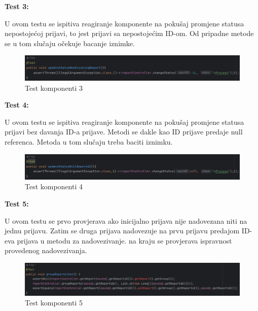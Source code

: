 			\textbf{Test 3:}
			
			U ovom testu se ispitiva reagiranje komponente na pokušaj promjene statusa nepostojećoj prijavi, to jest prijavi sa nepostojećim ID-om. Od pripadne metode se u tom slučaju očekuje bacanje iznimke.
			
			\begin{figure}[H]
				\includegraphics[width=\textwidth]{slike/JUnitTest3.png} %
				\caption{Test komponenti 3}
				\label{fig:JUnitTest3} %
			\end{figure}
				
			\textbf{Test 4:}
			
			U ovom testu se ispitiva reagiranje komponente na pokušaj promjene statusa prijavi bez davanja ID-a prijave. Metodi se dakle kao ID prijave predaje null referenca. Metoda u tom slučaju treba baciti iznimku.
			
			\begin{figure}[H]
				\includegraphics[width=\textwidth]{slike/JUnitTest4.png} %
				\caption{Test komponenti 4}
				\label{fig:JUnitTest4} %
			\end{figure}
			
			\textbf{Test 5:}
			
			U ovom testu se prvo provjerava ako inicijalno prijava nije nadovezana niti na jednu prijavu. Zatim se druga prijava nadovezuje na prvu prijavu predajom ID-eva prijava u metodu za nadovezivanje. na kraju se provjerava ispravnost provedenog nadovezivanja.
			
			\begin{figure}[H]
				\includegraphics[width=\textwidth]{slike/JUnitTest5.png} %
				\caption{Test komponenti 5}
				\label{fig:JUnitTest5} %
			\end{figure}
			
